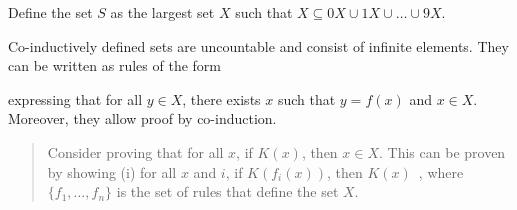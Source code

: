 \begin{definition}[Interval {$[0, 1]$}]
    Define the set $S$ as the largest set $X$ such that $X \subseteq 0X \cup 1X \cup \ldots \cup 9X$.
\end{definition}


\begin{remark}
    Co-inductively defined sets are uncountable and consist of infinite elements.
    They can be written as rules of the form
    \begin{prooftree}
\end{prooftree}
   expressing that for all $y \in X$, there exists $x$ such that $y = f(x)$ and $x \in X$. Moreover, they allow proof by co-induction.
    \begin{quote}
        Consider proving that for all $x$, if $K(x)$, then $x \in X$.
		This can be proven by showing (i) for all $x$ and $i$, if $K(f_i(x))$, then $K(x)$ \,, where $\{f_1, \ldots, f_n\}$ is the set of rules that define the set $X$.
    \end{quote}
\end{remark}




